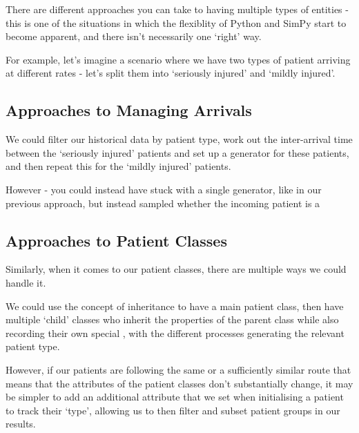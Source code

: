 \documentclass[
  letterpaper,
  DIV=11,
  numbers=noendperiod]{scrreprt}
\begin{document}
\begin{tcolorbox}[enhanced jigsaw, colframe=quarto-callout-note-color-frame, bottomtitle=1mm, breakable, rightrule=.15mm, coltitle=black, colbacktitle=quarto-callout-note-color!10!white, opacityback=0, leftrule=.75mm, arc=.35mm, toptitle=1mm, title=\textcolor{quarto-callout-note-color}{\faInfo}\hspace{0.5em}{Note}, titlerule=0mm, colback=white, toprule=.15mm, bottomrule=.15mm, left=2mm, opacitybacktitle=0.6]

There are different approaches you can take to having multiple types of
entities - this is one of the situations in which the flexiblity of
Python and SimPy start to become apparent, and there isn't necessarily
one `right' way.

For example, let's imagine a scenario where we have two types of patient
arriving at different rates - let's split them into `seriously injured'
and `mildly injured'.

\subsection{Approaches to Managing
Arrivals}\label{approaches-to-managing-arrivals}

We could filter our historical data by patient type, work out the
inter-arrival time between the `seriously injured' patients and set up a
generator for these patients, and then repeat this for the `mildly
injured' patients.

However - you could instead have stuck with a single generator, like in
our previous approach, but instead sampled whether the incoming patient
is a

\subsection{Approaches to Patient
Classes}\label{approaches-to-patient-classes}

Similarly, when it comes to our patient classes, there are multiple ways
we could handle it.

We could use the concept of inheritance to have a main patient class,
then have multiple `child' classes who inherit the properties of the
parent class while also recording their own special , with the different
processes generating the relevant patient type.

However, if our patients are following the same or a sufficiently
similar route that means that the attributes of the patient classes
don't substantially change, it may be simpler to add an additional
attribute that we set when initialising a patient to track their `type',
allowing us to then filter and subset patient groups in our results.

\end{tcolorbox}
\end{document}
